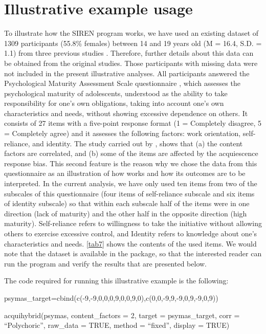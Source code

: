 \section{Illustrative example usage}

To illustrate how the SIREN program works, we have used an existing dataset of 1309 participants (55.8\% females) between 14 and 19 years old (M = 16.4, S.D. = 1.1) from three previous studies \citep{Morales-Vives:2018, Morales-Vives:2020, Morales-Vives:inpress}. Therefore, further details about this data can be obtained from the original studies. Those participants with missing data were not included in the present illustrative analyses. All participants answered the Psychological Maturity Assessment Scale questionnaire \citep[PSYMAS]{Morales-Vives:2013}, which assesses the psychological maturity of adolescents, understood as the ability to take responsibility for one's own obligations, taking into account one's own characteristics and needs, without showing excessive dependence on others. It consists of 27 items with a five-point response format (1 = Completely disagree, 5 = Completely agree) and it assesses the following factors: work orientation, self-reliance, and identity. The study carried out by  \citep{Morales-Vives:2013}, shows that (a) the content factors are correlated, and (b) some of the items are affected by the acquiescence response bias. This second feature is the reason why we chose the data from this questionnaire as an illustration of how  works and how its outcomes are to be interpreted. In the current analysis, we have only used ten items from two of the subscales of this questionnaire (four items of self-reliance subscale and six items of identity subscale) so that within each subscale half of the items were in one direction (lack of maturity) and the other half in the opposite direction (high maturity). Self-reliance refers to willingness to take the initiative without allowing others to exercise excessive control, and Identity refers to knowledge about one’s characteristics and needs. \cref{tab7} shows the contents of the used items. We would note that the dataset is available in the   package, so that the interested reader can run the program and verify the results that are presented below.

The code required for running this illustrative example is the following:

\begin{example}
  psymas_target=cbind(c(-9,-9,0,0,0,9,0,0,9,0),c(0,0,-9,9,-9,0,9,-9,0,9))

  acquihybrid(psymas, content_factors = 2, target = psymas_target,
    corr = “Polychoric”, raw_data = TRUE, method = “fixed”, display = TRUE)
\end{example}

